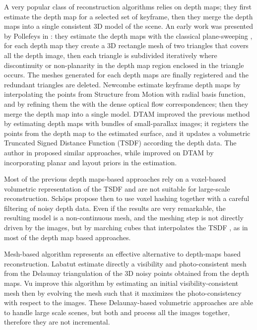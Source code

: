 \documentclass[times,10pt,twocolumn]{article}
\begin{document}
A very popular class of reconstruction algorithms relies on depth maps; they first estimate the depth map for a selected set of keyframe, then they merge the depth maps into a single consistent 3D model of the scene. 
An early work was presented by Pollefeys \etal in \cite{pollefeys_et_al_08}: they estimate the depth maps with the classical plane-sweeping \cite{collins1996space}, for each depth map they create a 3D rectangle mesh of two triangles that covers all the depth image, then each triangle is subdivided iteratively where discontinuity or non-planarity in the depth map region enclosed in the triangle occurs. The meshes generated for each depth maps are finally registered and the redundant triangles are deleted.
Newcombe \etal \cite{newcombe2010live} estimate keyframe depth maps by interpolating the points from Structure from Motion with radial basis function, and by  refining them the with the dense optical flow correspondences; then they merge the depth map into a single model.
DTAM \cite{newcombe2011dtam} improved the previous method by estimating depth maps with bundles of small-parallax images; it registers the points from the depth map to the estimated surface, and it updates a volumetric Truncated Signed Distance Function (TSDF) according the depth data. 
The author in \cite{stuhmer2012parallel,stuckler2014multi} proposed similar approaches, while \cite{concha2015incorporating} improved on DTAM by incorporating planar and layout priors in the estimation. 


Most of the previous depth maps-based approaches rely on a voxel-based volumetric representation of the TSDF and are not suitable for large-scale reconstruction. Sch{\"o}ps \etal \cite{schops20153d} propose then to use voxel hashing together with a careful filtering of noisy depth data.
Even if the results are very remarkable, the resulting model is a non-continuous mesh, and the meshing step is not directly driven by the images, but by marching cubes \cite{lorensen1987marching} that interpolates the TSDF , as in most of the depth map based approaches.

Mesh-based algorithm represents an effective alternative to depth-maps based reconstruction. Labatut \etal \cite{labatut2007efficient} estimate directly a visibility and photo-consistent mesh from the Delaunay triangulation of the 3D noisy points obtained from the depth maps.
Vu \etal  \cite{vu_et_al_2012} improve this algorithm by estimating an initial visibility-consistent mesh then by evolving the mesh such that it maximizes the photo-consistency with respect to the images. 
These Delaunay-based volumetric approaches are able to handle large scale scenes, but both \cite{labatut2007efficient} and \cite{vu_et_al_2012} process all the images together, therefore they are not incremental.
\end{document}
